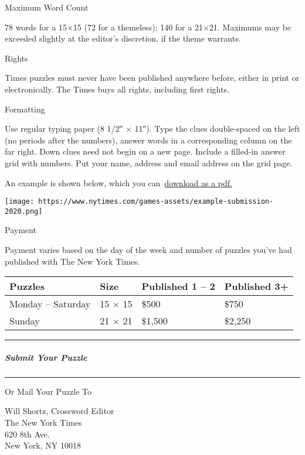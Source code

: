 Maximum Word Count

78 words for a 15×15 (72 for a themeless); 140 for a 21×21. Maximums may
be exceeded slightly at the editor's discretion, if the theme warrants.

Rights

Times puzzles must never have been published anywhere before, either in
print or electronically. The Times buys all rights, including first
rights.

Formatting

Use regular typing paper (8 1/2″ × 11″). Type the clues double-spaced on
the left (no periods after the numbers), answer words in a corresponding
column on the far right. Down clues need not begin on a new page.
Include a filled-in answer grid with numbers. Put your name, address and
email address on the grid page.

An example is shown below, which you
can~\href{https://static01.nyt.com/packages/other/crossword/puzzle-media/shared/Sample-Submission-2020.pdf}{download
as a pdf.}

\texttt{[image: https://www.nytimes.com/games-assets/example-submission-2020.png]}

Payment

Payment varies based on the day of the week and number of puzzles you've
had published with The New York Times.

\begin{longtable}[]{@{}llll@{}}
\toprule
Puzzles & Size & Published 1 -- 2 & Published 3+\tabularnewline
\midrule
\endhead
Monday -- Saturday & 15 × 15 & \$500 & \$750\tabularnewline
Sunday & 21 × 21 & \$1,500 & \$2,250\tabularnewline
\bottomrule
\end{longtable}

\begin{center}\rule{0.5\linewidth}{\linethickness}\end{center}

\hypertarget{submit-your-puzzle}{%
\subparagraph{Submit Your Puzzle}\label{submit-your-puzzle}}

\begin{center}\rule{0.5\linewidth}{\linethickness}\end{center}

Or Mail Your Puzzle To

Will Shortz, Crossword Editor\\
The New York Times\\
620 8th Ave.\\
New York, NY 10018

